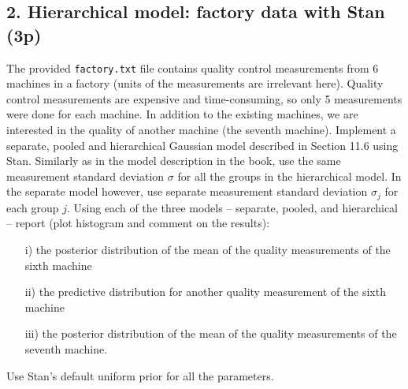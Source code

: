 \documentclass[a4paper,11pt]{article}
\begin{document}
\subsection*{2. Hierarchical model: factory data with Stan (3p)}
The provided {\tt factory.txt} file contains quality control measurements from 6 machines in a factory (units of the measurements are irrelevant here). Quality control measurements are expensive and time-consuming, so only 5 measurements were done for each machine. In addition to the existing machines, we are interested in the quality of another machine (the seventh machine).
Implement a separate, pooled and hierarchical Gaussian model described in Section 11.6 using Stan.
Similarly as in the model description in the book, use the same measurement standard deviation $\sigma$ for all the groups in the hierarchical model. In the separate model however, use separate measurement standard deviation $\sigma_j$ for each group $j$.
Using each of the three models -- separate, pooled, and hierarchical -- report (plot histogram and comment on the results):
\begin{itemize}
	\item [i)] the posterior distribution of the mean of the quality measurements of the sixth machine
	\item [ii)] the predictive distribution for another quality measurement of the sixth machine
	\item [iii)] the posterior distribution of the mean of the quality measurements of the seventh machine.
\end{itemize}
Use Stan's default uniform prior for all the parameters.
\end{document}
